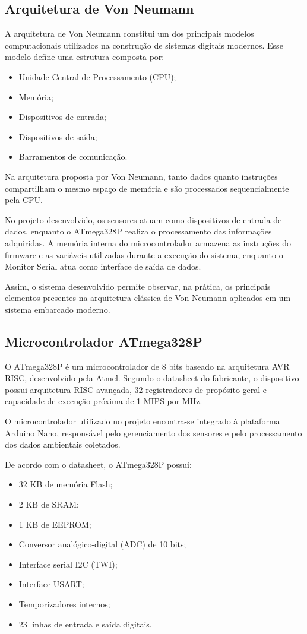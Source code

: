 \documentclass[a4paper,12pt]{article}
\begin{document}
\subsection{Arquitetura de Von Neumann}

A arquitetura de Von Neumann constitui um dos principais modelos computacionais utilizados na construção de sistemas digitais modernos. Esse modelo define uma estrutura composta por:
\begin{itemize}
    \item Unidade Central de Processamento (CPU);
    \item Memória;
    \item Dispositivos de entrada;
    \item Dispositivos de saída;
    \item Barramentos de comunicação.
\end{itemize}

Na arquitetura proposta por Von Neumann, tanto dados quanto instruções compartilham o mesmo espaço de memória e são processados sequencialmente pela CPU.

No projeto desenvolvido, os sensores atuam como dispositivos de entrada de dados, enquanto o ATmega328P realiza o processamento das informações adquiridas. A memória interna do microcontrolador armazena as instruções do firmware e as variáveis utilizadas durante a execução do sistema, enquanto o Monitor Serial atua como interface de saída de dados.

Assim, o sistema desenvolvido permite observar, na prática, os principais elementos presentes na arquitetura clássica de Von Neumann aplicados em um sistema embarcado moderno.

\subsection{Microcontrolador ATmega328P}

O ATmega328P é um microcontrolador de 8 bits baseado na arquitetura AVR RISC, desenvolvido pela Atmel. Segundo o datasheet do fabricante, o dispositivo possui arquitetura RISC avançada, 32 registradores de propósito geral e capacidade de execução próxima de 1 MIPS por MHz.

O microcontrolador utilizado no projeto encontra-se integrado à plataforma Arduino Nano, responsável pelo gerenciamento dos sensores e pelo processamento dos dados ambientais coletados.

De acordo com o datasheet, o ATmega328P possui:
\begin{itemize}
    \item 32 KB de memória Flash;
    \item 2 KB de SRAM;
    \item 1 KB de EEPROM;
    \item Conversor analógico-digital (ADC) de 10 bits;
    \item Interface serial I2C (TWI);
    \item Interface USART;
    \item Temporizadores internos;
    \item 23 linhas de entrada e saída digitais.
\end{itemize}
\end{document}
